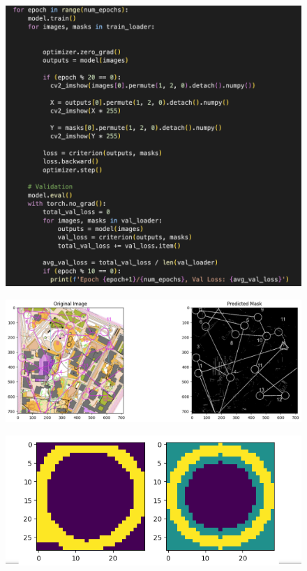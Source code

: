 \documentclass[a4paper,12pt]{extarticle}
\begin{document}
\begin{figure}[H]
    \centering
    \includegraphics[width=\linewidth]{CNN training loop.png}
    \label{fig:training-CNN}
\end{figure}
\begin{figure}[H]
    \centering
    \includegraphics[width=\linewidth]{Predicted mask.png}
    \label{fig:prediction-CNN}
\end{figure}
\begin{figure}[H]
    \centering
    \includegraphics[width=\linewidth]{circle_kernel.png}
    \label{fig:circlekernel}
\end{figure}
\end{document}
